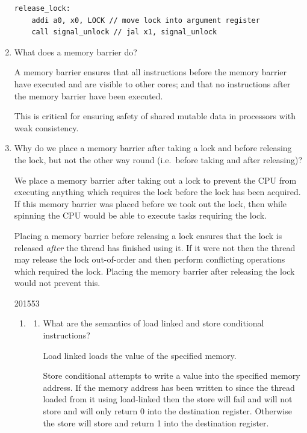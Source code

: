 \documentclass[10pt,\jkfside,a4paper]{article}
\begin{document}
\begin{enumerate}
\begin{lstlisting}
release_lock:
	addi a0, x0, LOCK // move lock into argument register
	call signal_unlock // jal x1, signal_unlock
\end{lstlisting}

\item What does a memory barrier do?

A memory barrier ensures that all instructions before the memory barrier have
executed and are visible to other cores; and that no instructions after the
memory barrier have been executed.

This is critical for ensuring safety of shared mutable data in processors
with weak consistency.

\item Why do we place a memory barrier after taking a lock and before
releasing the lock, but not the other way round (i.e.\ before taking and
after releasing)?

We place a memory barrier after taking out a lock to prevent the CPU from
executing anything which requires the lock before the lock has been acquired.
If this memory barrier was placed before we took out the lock, then while
spinning the CPU would be able to execute tasks requiring the lock.

Placing a memory barrier before releasing a lock ensures that the lock is
released \textit{after} the thread has finished using it. If it were not
then the thread may release the lock out-of-order and then perform
conflicting operations which required the lock. Placing the memory barrier
after releasing the lock would not prevent this.

\begin{examquestion}{2015}{5}{3}

\begin{enumerate}[label=(\alph*)]

\item

\begin{enumerate}[label=(\roman*)]

\item What are the semantics of load linked and store conditional instructions?

Load linked loads the value of the specified memory.

Store conditional attempts to write a value into the specified memory
address. If the memory address has been written to since the thread loaded
from it using load-linked then the store will fail and will not store and
will only return 0 into the destination register. Otherwise the store will
store and return 1 into the destination register.


\end{enumerate}
\end{enumerate}
\end{examquestion}
\end{enumerate}
\end{document}
